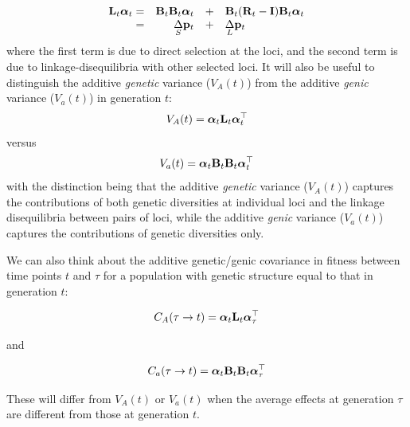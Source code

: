 \documentclass[12pt]{article}
\begin{document}
\begin{bibunit}
\begin{equation}
\begin{array}{rrcl}
{\bf L}_t\boldsymbol{\alpha}_t =& {\bf B}_t{\bf B}_t\boldsymbol{\alpha}_t&+&{\bf B}_t({\bf R}_t-{\bf I}){\bf B}_t\boldsymbol{\alpha}_t\\
=&\underset{S}\Delta {\bf p}_t&+&\underset{L}\Delta {\bf p}_t
\end{array}
\end{equation}
where the first term is due to direct selection at the loci, and the second term is due to linkage-disequilibria with other selected loci. It will also be useful to distinguish the additive \textit{genetic} variance ($V_A(t)$) from the additive \textit{genic} variance  ($V_a(t)$) in generation $t$:
\begin{equation}
V_A(t) = \boldsymbol{\alpha}_t{\bf L}_t\boldsymbol{\alpha}^{\top}_t
\end{equation}
versus
\begin{equation}
V_a(t) = \boldsymbol{\alpha}_t{\bf B}_t{\bf B}_t\boldsymbol{\alpha}^{\top}_t
\end{equation}
with the distinction being that the additive \emph{genetic} variance ($V_A(t)$) captures the contributions of both genetic diversities at individual loci and the linkage disequilibria between pairs of loci, while the additive \emph{genic} variance ($V_a(t)$) captures the contributions of genetic diversities only.

We can also think about the additive genetic/genic covariance in fitness between time points $t$ and $\tau$ for a population with genetic structure equal to that in generation $t$:

\begin{equation}
C_A(\tau\rightarrow t) = \boldsymbol{\alpha}_{t}{\bf L}_t\boldsymbol{\alpha}^{\top}_{\tau}
\end{equation}

and

\begin{equation}
C_a(\tau\rightarrow t) = \boldsymbol{\alpha}_{t}{\bf B}_t{\bf B}_t\boldsymbol{\alpha}^{\top}_{\tau}
\end{equation}

These will differ from $V_A(t)$ or $V_a(t)$ when the average effects at generation $\tau$ are different from those at generation $t$. 


\end{bibunit}
\end{document}
